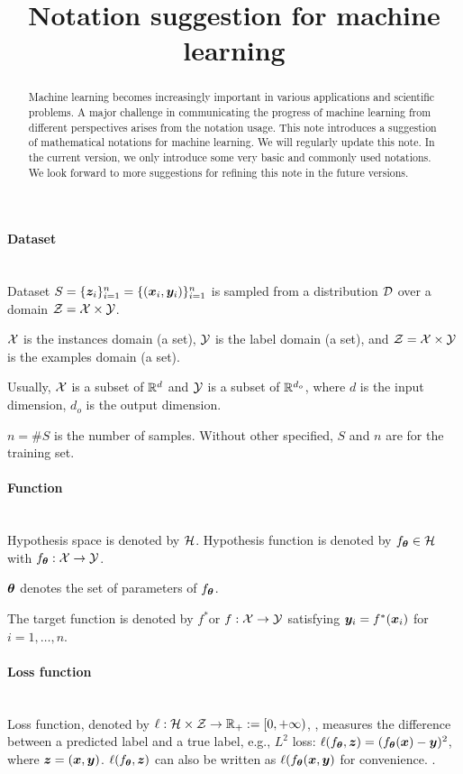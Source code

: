 \documentclass[]{article}
\begin{document}
\title{Notation suggestion for machine learning}
\author{}

\maketitle 
\begin{abstract}
Machine learning becomes increasingly important in various applications and scientific problems. A major challenge in communicating the progress of machine learning from different perspectives arises from the notation usage. This note introduces a suggestion of mathematical notations for machine learning. We will regularly update this note. In the current version, we only introduce some very basic and commonly used notations. We look forward to more suggestions for refining this note in the future versions.
\end{abstract}

\paragraph{Dataset}~\\
Dataset  $S=\{\bm{z}_i\}_{i=1}^n=\{(\bm{x}_i,\bm{y}_i)\}_{i=1}^n$ is sampled from a distribution $\mathcal{D}$ over a domain $\mathcal{Z}=\mathcal{X}\times\mathcal{Y}$. 

$\mathcal{X}$  is the instances domain (a set), $\mathcal{Y}$ is the label domain (a set), and $\mathcal{Z}=\mathcal{X}\times\mathcal{Y}$ is the examples domain (a set). 

Usually, 
$\mathcal{X}$ is a subset of $\mathbb{R}^d$ and $\mathcal{Y}$ is a subset of $\mathbb{R}^{d_{o}}$, where $d$ is the input dimension, $d_{o}$ is the output dimension.

$n=\#S$ is the number of samples. Without other specified, $S$ and $n$ are for the training set.

\paragraph{Function}~\\
Hypothesis space is denoted by $\mathcal{H}$. Hypothesis function is denoted by $f_{\bm{\theta}}\in\mathcal{H}$ with $f_{\bm{\theta}}:\mathcal{X}\to\mathcal{Y}$.

$\bm{\theta}$  denotes the set of parameters of  $f_{\bm{\theta}}$.  

The target function is denoted by $f^*$or $f:\mathcal{X}\to\mathcal{Y}$ satisfying $\bm{y}_i=f^*(\bm{x}_i)$ for $i=1,\ldots,n$.

\paragraph{Loss function}~\\
Loss function, denoted by $\ell:\mathcal{H}\times\mathcal{Z}\to\mathbb{R}_+:=[0,+\infty)$, , measures the difference between a predicted label and a true label, e.g., $L^2$ loss: $\ell(f_{\bm{\theta}},\bm{z})=(f_{\bm{\theta}}(\bm{x})-\bm{y})^2$, where $\bm{z}=(\bm{x},\bm{y})$. $\ell(f_{\bm{\theta}},\bm{z})$ can also be written as $\ell(f_{\bm{\theta}}(\bm{x},\bm{y})$ for convenience. .
\end{document}
